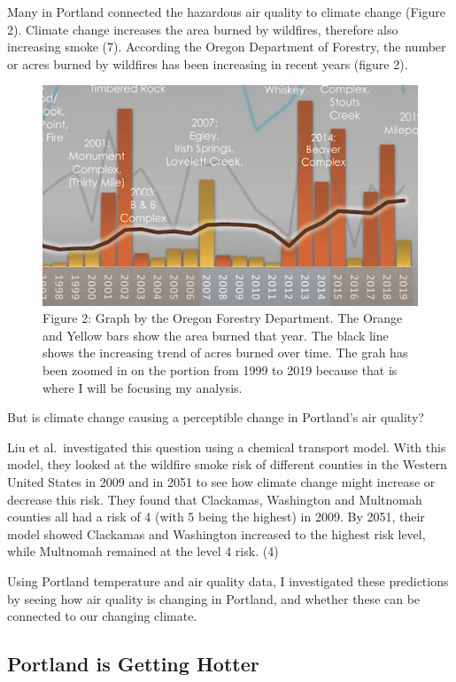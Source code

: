 \documentclass[]{article}
\begin{document}
Many in Portland connected the hazardous air quality to climate change
(Figure 2). Climate change increases the area burned by wildfires,
therefore also increasing smoke (7). According the Oregon Department of
Forestry, the number or acres burned by wildfires has been increasing in
recent years (figure 2).

\begin{figure}
\centering
\includegraphics{Screen Shot 2020-09-26 at 12.53.31 PM.png}
\caption{Figure 2: Graph by the Oregon Forestry Department. The Orange
and Yellow bars show the area burned that year. The black line shows the
increasing trend of acres burned over time. The grah has been zoomed in
on the portion from 1999 to 2019 because that is where I will be
focusing my analysis.}
\end{figure}

But is climate change causing a perceptible change in Portland's air
quality?

Liu et al.~investigated this question using a chemical transport model.
With this model, they looked at the wildfire smoke risk of different
counties in the Western United States in 2009 and in 2051 to see how
climate change might increase or decrease this risk. They found that
Clackamas, Washington and Multnomah counties all had a risk of 4 (with 5
being the highest) in 2009. By 2051, their model showed Clackamas and
Washington increased to the highest risk level, while Multnomah remained
at the level 4 risk. (4)

Using Portland temperature and air quality data, I investigated these
predictions by seeing how air quality is changing in Portland, and
whether these can be connected to our changing climate.

\hypertarget{portland-is-getting-hotter}{%
\subsection{Portland is Getting
Hotter}\label{portland-is-getting-hotter}}
\end{document}
